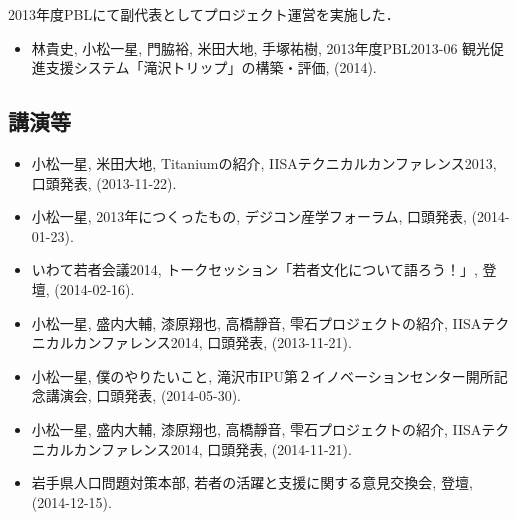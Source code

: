 \documentclass{jsarticle}
\begin{document}
2013年度PBLにて副代表としてプロジェクト運営を実施した．

\begin{itemize}
\item 林貴史, 小松一星, 門脇裕, 米田大地, 手塚祐樹, 2013年度PBL2013-06 観光促進支援システム「滝沢トリップ」の構築・評価, (2014).
\end{itemize}

\subsection*{講演等}

\begin{itemize}
\item 小松一星, 米田大地, Titaniumの紹介, IISAテクニカルカンファレンス2013, 口頭発表, (2013-11-22).
\item 小松一星, 2013年につくったもの, デジコン産学フォーラム, 口頭発表, (2014-01-23).
\item いわて若者会議2014, トークセッション「若者文化について語ろう！」, 登壇, (2014-02-16).
\item 小松一星, 盛内大輔, 漆原翔也, 高橋靜音, 雫石プロジェクトの紹介, IISAテクニカルカンファレンス2014, 口頭発表, (2013-11-21).
\item 小松一星, 僕のやりたいこと, 滝沢市IPU第２イノベーションセンター開所記念講演会, 口頭発表, (2014-05-30).
\item 小松一星, 盛内大輔, 漆原翔也, 高橋靜音, 雫石プロジェクトの紹介, IISAテクニカルカンファレンス2014, 口頭発表, (2014-11-21).
\item 岩手県人口問題対策本部, 若者の活躍と支援に関する意見交換会, 登壇, (2014-12-15).
\end{itemize}
\end{document}
